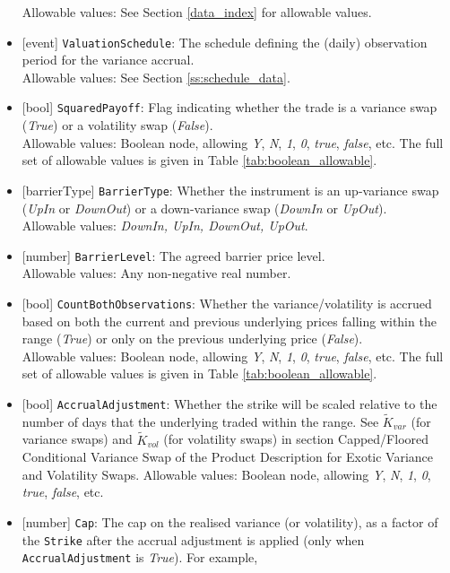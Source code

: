 \begin{itemize}
  Allowable values: See Section \ref{data_index} for allowable values.
  \item{}[event] \lstinline!ValuationSchedule!: The schedule defining the (daily) observation period for the variance accrual. \\
  Allowable values: See Section \ref{ss:schedule_data}.
  \item{}[bool] \lstinline!SquaredPayoff!: Flag indicating whether the trade is a variance swap (\emph{True}) or a volatility
  swap (\emph{False}). \\
  Allowable values: Boolean node, allowing \emph{Y}, \emph{N}, \emph{1}, \emph{0}, \emph{true}, \emph{false}, etc.
  The full set of allowable values is given in Table \ref{tab:boolean_allowable}.
  \item{}[barrierType] \lstinline!BarrierType!: Whether the instrument is an up-variance swap (\emph{UpIn} or \emph{DownOut}) or 
  a down-variance swap (\emph{DownIn} or \emph{UpOut}). \\
  Allowable values: \emph{DownIn, UpIn, DownOut, UpOut}.
  \item{}[number] \lstinline!BarrierLevel!: The agreed barrier price level. \\
  Allowable values: Any non-negative real number.
  \item{}[bool] \lstinline!CountBothObservations!: Whether the variance/volatility is accrued based on both the current and
  previous underlying prices falling within the range (\emph{True}) or only on the previous underlying price
  (\emph{False}). \\
  Allowable values: Boolean node, allowing \emph{Y}, \emph{N}, \emph{1}, \emph{0}, \emph{true}, \emph{false}, etc.
  The full set of allowable values is given in Table \ref{tab:boolean_allowable}.
  \item{}[bool] \lstinline!AccrualAdjustment!: Whether the strike will be scaled relative to the number of days that the
  underlying traded within the range. See $\widetilde{K}_{var}$ (for variance swaps) and $\widetilde{K}_{vol}$
  (for volatility swaps) in section Capped/Floored Conditional Variance Swap of the Product Description for
  Exotic Variance and Volatility Swaps.
  Allowable values: Boolean node, allowing \emph{Y}, \emph{N}, \emph{1}, \emph{0}, \emph{true}, \emph{false}, etc.
  \item{}[number] \lstinline!Cap!: The cap on the realised variance (or volatility), as a factor of the \lstinline!Strike! after
  the accrual adjustment is applied (only when \lstinline!AccrualAdjustment! is \emph{True}). For example,

\end{itemize}
